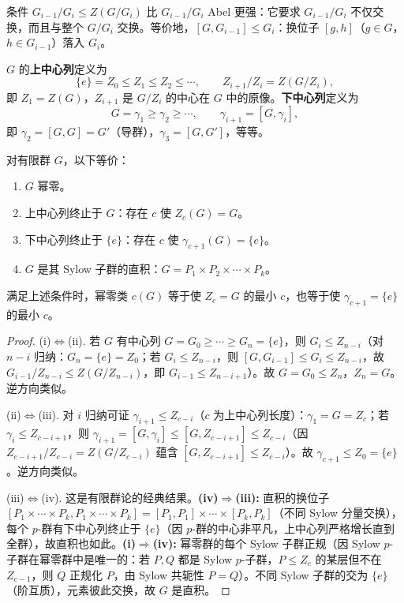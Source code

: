 条件 $G_{i-1}/G_i\le Z(G/G_i)$ 比 $G_{i-1}/G_i$ Abel 更强：它要求 $G_{i-1}/G_i$ 不仅交换，而且与整个 $G/G_i$ 交换。等价地，$[G,G_{i-1}]\le G_i$：换位子 $[g,h]$（$g\in G$，$h\in G_{i-1}$）落入 $G_i$。

\begin{definition}[上中心列与下中心列]
$G$ 的\textbf{上中心列}定义为
\[
\{e\}=Z_0\le Z_1\le Z_2\le\cdots,\qquad Z_{i+1}/Z_i=Z(G/Z_i),
\]
即 $Z_1=Z(G)$，$Z_{i+1}$ 是 $G/Z_i$ 的中心在 $G$ 中的原像。\textbf{下中心列}定义为
\[
G=\gamma_1\ge\gamma_2\ge\cdots,\qquad\gamma_{i+1}=[G,\gamma_i],
\]
即 $\gamma_2=[G,G]=G'$（导群），$\gamma_3=[G,G']$，等等。
\end{definition}

\begin{theorem}[幂零群的等价刻画]
\label{thm:nilpotent-equivalent}
对有限群 $G$，以下等价：
\begin{enumerate}[label=(\roman*),leftmargin=3em]
\item $G$ 幂零。
\item 上中心列终止于 $G$：存在 $c$ 使 $Z_c(G)=G$。
\item 下中心列终止于 $\{e\}$：存在 $c$ 使 $\gamma_{c+1}(G)=\{e\}$。
\item $G$ 是其 Sylow 子群的直积：$G=P_1\times P_2\times\cdots\times P_k$。
\end{enumerate}
满足上述条件时，幂零类 $c(G)$ 等于使 $Z_c=G$ 的最小 $c$，也等于使 $\gamma_{c+1}=\{e\}$ 的最小 $c$。
\end{theorem}

\begin{proof}
(i)$\Leftrightarrow$(ii). 若 $G$ 有中心列 $G=G_0\ge\cdots\ge G_n=\{e\}$，则 $G_i\le Z_{n-i}$（对 $n-i$ 归纳：$G_n=\{e\}=Z_0$；若 $G_i\le Z_{n-i}$，则 $[G,G_{i-1}]\le G_i\le Z_{n-i}$，故 $G_{i-1}/Z_{n-i}\le Z(G/Z_{n-i})$，即 $G_{i-1}\le Z_{n-i+1}$）。故 $G=G_0\le Z_n$，$Z_n=G$。逆方向类似。

(ii)$\Leftrightarrow$(iii). 对 $i$ 归纳可证 $\gamma_{i+1}\le Z_{c-i}$（$c$ 为上中心列长度）：$\gamma_1=G=Z_c$；若 $\gamma_i\le Z_{c-i+1}$，则 $\gamma_{i+1}=[G,\gamma_i]\le[G,Z_{c-i+1}]\le Z_{c-i}$（因 $Z_{c-i+1}/Z_{c-i}=Z(G/Z_{c-i})$ 蕴含 $[G,Z_{c-i+1}]\le Z_{c-i}$）。故 $\gamma_{c+1}\le Z_0=\{e\}$。逆方向类似。

(iii)$\Leftrightarrow$(iv). 这是有限群论的经典结果。\textbf{(iv)$\Rightarrow$(iii):} 直积的换位子 $[P_1\times\cdots\times P_k,P_1\times\cdots\times P_k]=[P_1,P_1]\times\cdots\times[P_k,P_k]$（不同 Sylow 分量交换），每个 $p$-群有下中心列终止于 $\{e\}$（因 $p$-群的中心非平凡，上中心列严格增长直到全群），故直积也如此。\textbf{(i)$\Rightarrow$(iv):} 幂零群的每个 Sylow 子群正规（因 Sylow $p$-子群在幂零群中是唯一的：若 $P,Q$ 都是 Sylow $p$-子群，$P\le Z_c$ 的某层但不在 $Z_{c-1}$，则 $Q$ 正规化 $P$，由 Sylow 共轭性 $P=Q$）。不同 Sylow 子群的交为 $\{e\}$（阶互质），元素彼此交换，故 $G$ 是直积。
\end{proof}

